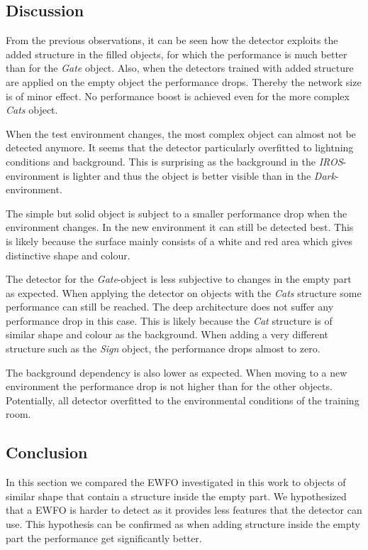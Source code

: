 \subsection{Discussion}

From the previous observations, it can be seen how the detector exploits the added structure in the filled objects, for which the performance is much better than for the \textit{Gate} object. Also, when the detectors trained with added structure are applied on the empty object the performance drops. Thereby the network size is of minor effect. No performance boost is achieved even for the more complex \textit{Cats} object.

When the test environment changes, the most complex object can almost not be detected anymore. It seems that the detector particularly overfitted to lightning conditions and background. This is surprising as the background in the \textit{IROS}-environment is lighter and thus the object is better visible than in the \textit{Dark}-environment.

The simple but solid object is subject to a smaller performance drop when the environment changes. In the new environment it can still be detected best. This is likely because the surface mainly consists of a white and red area which gives distinctive shape and colour.

The detector for the \textit{Gate}-object is less subjective to changes in the empty part as expected. When applying the detector on objects with the \textit{Cats} structure some performance can still be reached. The deep architecture does not suffer any performance drop in this case. This is likely because the \textit{Cat} structure is of similar shape and colour as the background. When adding a very different structure such as the \textit{Sign} object, the performance drops almost to zero.

The background dependency is also lower as expected. When moving to a new environment the performance drop is not higher than for the other objects. Potentially, all detector overfitted to the environmental conditions of the training room.

\subsection{Conclusion}

In this section we compared the \ac{EWFO} investigated in this work to objects of similar shape that contain a structure inside the empty part. We hypothesized that a \ac{EWFO} is harder to detect as it provides less features that the detector can use. This hypothesis can be confirmed as when adding structure inside the empty part the performance get significantly better. 

